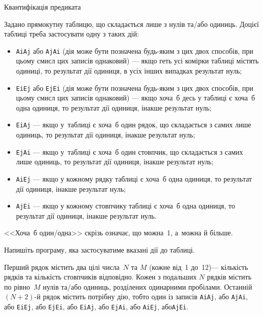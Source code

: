 {


\makeTableLongfalse

\begin{problemAllDefault}{Квантифікація предиката}

Задано прямокутну таблицю, що складається лише з нулів та/\nolinebreak[3]або одиниць.
До\nolinebreak[3] цієї таблиці треба застосувати одну з таких дій:

\begin{itemize}

\item
\texttt{AiAj} або \texttt{AjAi} (дія може бути позначена будь-яким з цих двох способів, при цьому смисл цих записів однаковий) --- якщо геть усі комірки таблиці містять одиниці, то результат дії одиниця, в усіх інших випадках результат нуль;

\item
\texttt{EiEj} або \texttt{EjEi} (дія може бути позначена будь-яким з цих двох способів, при цьому смисл цих записів однаковий) --- якщо хоча~б десь у таблиці є хоча~б одна одиниця, то результат дії одиниця, інакше результат нуль;

\item
\texttt{EiAj} --- якщо у~таблиці є хоча~б один рядок, що складається з самих лише одиниць, то результат дії одиниця, інакше результат нуль;

\item
\texttt{EjAi} --- якщо у~таблиці є хоча~б один стовпчик, що складається з самих лише одиниць, то результат дії одиниця, інакше результат нуль;

\item
\texttt{AiEj} --- якщо у кожному рядку таблиці є хоча~б одна одиниця, то результат дії одиниця, інакше результат нуль;

\item
\texttt{AjEi} --- якщо у кожному стовпчику таблиці є хоча~б одна одиниця, то результат дії одиниця, інакше результат нуль.


\end{itemize}

<<Хоча~б один/одна>> скрізь означає, що можна~1, а~можна й більше.

Напишіть програму, яка застосуватиме вказані дії до таблиці.

\InputFile
Перший рядок містить два цілі числа~$N$ та $M$ (кожне від~1 до~12)\nolinebreak[3] --- кількість рядків та кількість стовпчиків відповідно. 
Кожен з подальших $N$ рядків містить по рівно~$M$ нулів та/або одиниць, розділених одинарними пробілами.
Останній $(N{+}2)$-й рядок містить потрібну дію, тобто один із записів 
\texttt{AiAj}, або
\texttt{AjAi}, або
\texttt{EiEj}, або
\texttt{EjEi}, або
\texttt{EiAj}, або
\texttt{EjAi}, або
\texttt{AiEj}, або\nolinebreak[3]
\texttt{AjEi}.



\end{problemAllDefault}}
